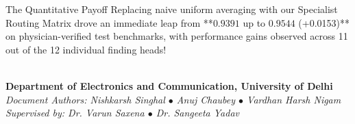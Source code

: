 \documentclass[11pt,a4paper]{article}
\begin{document}
\begin{breakthroughbox}{The Quantitative Payoff}
Replacing naive uniform averaging with our Specialist Routing Matrix drove an immediate leap from **$0.9391$ up to $0.9544$ (+0.0153)** on physician-verified test benchmarks, with performance gains observed across 11 out of the 12 individual finding heads!
\end{breakthroughbox}

\vspace{0.2in}
\begin{center}
    \noindent\makebox[\linewidth]{\color{BorderGray}\rule{\textwidth}{1.2pt}}\\[0.2cm]
    \textbf{\textcolor{DUPurple}{Department of Electronics and Communication, University of Delhi}}\\[0.1cm]
    \textit{Document Authors: Nishkarsh Singhal $\bullet$ Anuj Chaubey $\bullet$ Vardhan Harsh Nigam}\\[0.1cm]
    \textit{Supervised by: Dr. Varun Saxena $\bullet$ Dr. Sangeeta Yadav}
\end{center}
\end{document}

